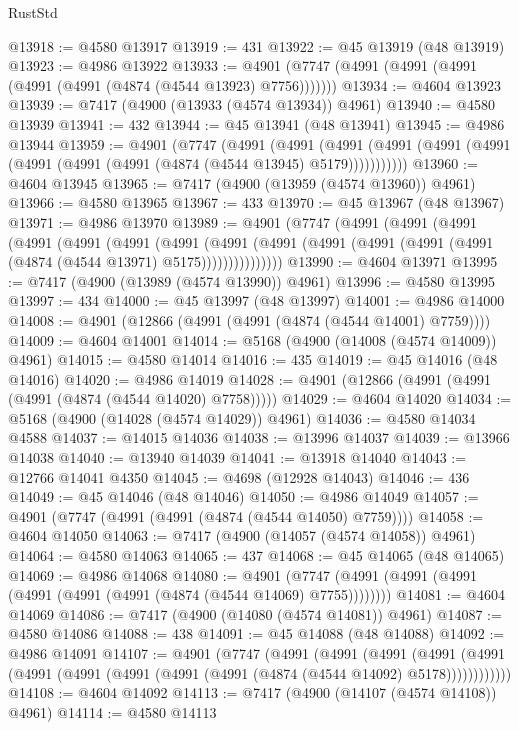 \begin{lexlean}{RustStd}
\begin{coremodule}
@13918 := @4580 @13917
@13919 := 431
@13922 := @45 @13919 (@48 @13919)
@13923 := @4986 @13922
@13933 := @4901 (@7747 (@4991 (@4991 (@4991 (@4991 (@4991 (@4874 (@4544 @13923) @7756)))))))
@13934 := @4604 @13923
@13939 := @7417 (@4900 (@13933 (@4574 @13934)) @4961)
@13940 := @4580 @13939
@13941 := 432
@13944 := @45 @13941 (@48 @13941)
@13945 := @4986 @13944
@13959 := @4901
    (@7747
      (@4991
        (@4991
          (@4991 (@4991 (@4991 (@4991 (@4991 (@4991 (@4991 (@4874 (@4544 @13945) @5179)))))))))))
@13960 := @4604 @13945
@13965 := @7417 (@4900 (@13959 (@4574 @13960)) @4961)
@13966 := @4580 @13965
@13967 := 433
@13970 := @45 @13967 (@48 @13967)
@13971 := @4986 @13970
@13989 := @4901
    (@7747
      (@4991
        (@4991
          (@4991
            (@4991
              (@4991
                (@4991
                  (@4991
                    (@4991
                      (@4991 (@4991 (@4991 (@4991 (@4991 (@4874 (@4544 @13971) @5175)))))))))))))))
@13990 := @4604 @13971
@13995 := @7417 (@4900 (@13989 (@4574 @13990)) @4961)
@13996 := @4580 @13995
@13997 := 434
@14000 := @45 @13997 (@48 @13997)
@14001 := @4986 @14000
@14008 := @4901 (@12866 (@4991 (@4991 (@4874 (@4544 @14001) @7759))))
@14009 := @4604 @14001
@14014 := @5168 (@4900 (@14008 (@4574 @14009)) @4961)
@14015 := @4580 @14014
@14016 := 435
@14019 := @45 @14016 (@48 @14016)
@14020 := @4986 @14019
@14028 := @4901 (@12866 (@4991 (@4991 (@4991 (@4874 (@4544 @14020) @7758)))))
@14029 := @4604 @14020
@14034 := @5168 (@4900 (@14028 (@4574 @14029)) @4961)
@14036 := @4580 @14034 @4588
@14037 := @14015 @14036
@14038 := @13996 @14037
@14039 := @13966 @14038
@14040 := @13940 @14039
@14041 := @13918 @14040
@14043 := @12766 @14041 @4350
@14045 := @4698 (@12928 @14043)
@14046 := 436
@14049 := @45 @14046 (@48 @14046)
@14050 := @4986 @14049
@14057 := @4901 (@7747 (@4991 (@4991 (@4874 (@4544 @14050) @7759))))
@14058 := @4604 @14050
@14063 := @7417 (@4900 (@14057 (@4574 @14058)) @4961)
@14064 := @4580 @14063
@14065 := 437
@14068 := @45 @14065 (@48 @14065)
@14069 := @4986 @14068
@14080 := @4901 (@7747 (@4991 (@4991 (@4991 (@4991 (@4991 (@4991 (@4874 (@4544 @14069) @7755))))))))
@14081 := @4604 @14069
@14086 := @7417 (@4900 (@14080 (@4574 @14081)) @4961)
@14087 := @4580 @14086
@14088 := 438
@14091 := @45 @14088 (@48 @14088)
@14092 := @4986 @14091
@14107 := @4901
    (@7747
      (@4991
        (@4991
          (@4991
            (@4991 (@4991 (@4991 (@4991 (@4991 (@4991 (@4991 (@4874 (@4544 @14092) @5178))))))))))))
@14108 := @4604 @14092
@14113 := @7417 (@4900 (@14107 (@4574 @14108)) @4961)
@14114 := @4580 @14113

\end{coremodule}
\end{lexlean}
